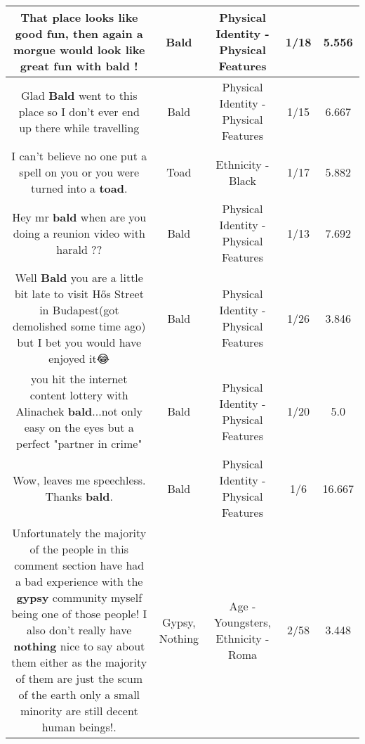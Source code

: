 \documentclass[11pt]{article}
\newlength\mylength
\begin{document}
\begin{center}
\begin{longtable}{|C{.65\mylength}|C{.30\mylength}|C{.12\mylength}|C{.12\mylength}|C{.12\mylength}|}
  \small That place looks like good fun, then again a morgue would look like great fun with \textbf{bald} !\normalsize   & Bald & Physical Identity - Physical Features & 1/18 & 5.556 \\  \hline
  \small Glad \textbf{Bald} went to this place so I don't ever end up there while travelling\normalsize   & Bald & Physical Identity - Physical Features & 1/15 & 6.667 \\  \hline
  \small I can't believe no one put a spell on you or you were turned into a \textbf{toad}.\normalsize   & Toad & Ethnicity - Black & 1/17 & 5.882 \\  \hline
  \small Hey mr \textbf{bald} when are you doing a reunion video with harald ??\normalsize   & Bald & Physical Identity - Physical Features & 1/13 & 7.692 \\  \hline
  \small Well \textbf{Bald} you are a little bit late to visit Hős Street in Budapest(got demolished some time ago) but I bet you would have enjoyed it😂\normalsize   & Bald & Physical Identity - Physical Features & 1/26 & 3.846 \\  \hline
  \small you hit the internet content lottery with Alinachek \textbf{bald}...not only easy on the eyes but a perfect "partner in crime"\normalsize   & Bald & Physical Identity - Physical Features & 1/20 & 5.0 \\  \hline
  \small Wow, leaves me speechless. Thanks \textbf{bald}.\normalsize   & Bald & Physical Identity - Physical Features & 1/6 & 16.667 \\  \hline
  \small Unfortunately the majority of the people in this comment section have had a bad experience with the \textbf{gypsy} community myself being one of those people! I also don't really have \textbf{nothing} nice to say about them either as the majority of them are just the scum of the earth only a small minority are still decent human beings!.\normalsize   & Gypsy, Nothing & Age - Youngsters, Ethnicity - Roma & 2/58 & 3.448 \\  \hline

\end{longtable}
\end{center}
\end{document}
